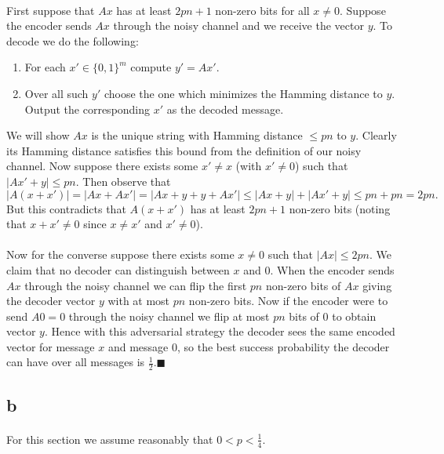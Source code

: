 \documentclass[letterpaper,12pt,oneside,onecolumn]{article}
\begin{document}
\paragraph{}
First suppose that $Ax$ has at least $2pn+1$ non-zero bits for all $x\neq 0$. Suppose the encoder sends $Ax$ through the noisy channel and we receive the vector $y$. To decode we do the following:
\begin{enumerate}
    \item For each $x' \in \{0,1\}^m$ compute $y' = Ax'$.
    \item Over all such $y'$ choose the one which minimizes the Hamming distance to $y$. Output the corresponding $x'$ as the decoded message.
\end{enumerate}
We will show $Ax$ is the unique string with Hamming distance $\leq pn$ to $y$. Clearly its Hamming distance satisfies this bound from the definition of our noisy channel. Now suppose there exists some $x' \neq x$ (with $x' \neq 0$) such that $|Ax' +y| \leq pn$. Then observe that
$$|A(x + x')| = |Ax + Ax'| = |Ax + y + y + Ax'| \leq |Ax + y| + |Ax' + y| \leq pn + pn = 2pn.$$
But this contradicts that $A(x+x')$ has at least $2pn+1$ non-zero bits (noting that $x+x' \neq 0$ since $x\neq x'$ and $x' \neq 0$).
\paragraph{}
Now for the converse suppose there exists some $x\neq 0$ such that $|Ax| \leq 2pn$. We claim that no decoder can distinguish between $x$ and $0$. When the encoder sends $Ax$ through the noisy channel we can flip the first $pn$ non-zero bits of $Ax$ giving the decoder vector $y$ with at most $pn$ non-zero bits. Now if the encoder were to send $A0 = 0$ through the noisy channel we flip at most $pn$ bits of $0$ to obtain vector $y$. Hence with this adversarial strategy the decoder sees the same encoded vector for message $x$ and message $0$, so the best success probability the decoder can have over all messages is $\frac{1}{2}$.$\blacksquare$
\subsection{b}
\paragraph{}
For this section we assume reasonably that $0<p<\frac{1}{4}$.
\end{document}
